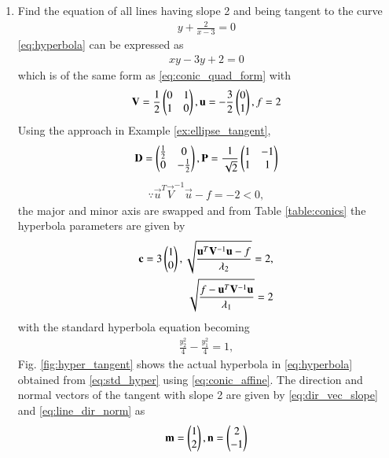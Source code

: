 \renewcommand{\theequation}{\theenumi}
\begin{enumerate}[label=\thesubsection.\arabic*.,ref=\thesubsection.\theenumi]
\item 
Find the equation of all lines having slope 2 and being tangent to the curve 
\begin{align}
\label{eq:hyperbola}
y + \frac{2}{x-3} = 0
\end{align}
\solution 
\eqref{eq:hyperbola} can be expressed as
\begin{align}
\label{eq:conic_nofrac}
xy -3y + 2 = 0
\end{align}
which is of the same form as \eqref{eq:conic_quad_form} with 
\begin{align}
\label{eq:hyper_quad_form_param}
\mathbf{V} = \frac{1}{2}\begin{pmatrix}0 & 1\\ 1 & 0\end{pmatrix}, \mathbf{u} = -\frac{3}{2}\begin{pmatrix}0 \\1\end{pmatrix}, f = 2
\end{align}
Using the approach in Example \ref{ex:ellipse_tangent},
\begin{align}
\mathbf{D} = \begin{pmatrix}\frac{1}{2} & 0 \\ 0 & -\frac{1}{2}\end{pmatrix}, \mathbf{P} = \frac{1}{\sqrt{2}}\begin{pmatrix}1 & -1\\1 & 1\end{pmatrix}
\end{align}
\begin{align}
\because \vec{u}^T\vec{V}^{-1}\vec{u}-f = -2 < 0,
\end{align} 
the major and minor axis are swapped and from Table \ref{table:conics}
the hyperbola parameters are given by 
\begin{align}
\mathbf{c}= 3\begin{pmatrix}1\\0\end{pmatrix},
\sqrt{\frac{\mathbf{u}^T\mathbf{V}^{-1}\mathbf{u}-f}{\lambda_2}} = 2,
\\
\sqrt{\frac{f-\mathbf{u}^T\mathbf{V}^{-1}\mathbf{u}}{\lambda_1}} = 2
\end{align}
with the standard hyperbola equation becoming
\begin{align}
\frac{y_2^2}{4}-\frac{y_1^2}{4} = 1,
\label{eq:std_hyper}
\end{align}
%
Fig. \ref{fig:hyper_tangent}	shows  the actual hyperbola in \eqref{eq:hyperbola}  obtained from  
\eqref{eq:std_hyper}  using \eqref{eq:conic_affine}.  
The direction and normal vectors of the tangent with slope 2 are given by \eqref{eq:dir_vec_slope} and \eqref{eq:line_dir_norm} as
\begin{align}
\vec{m} = \myvec{1\\2}, \vec{n} = \myvec{2\\-1}

\end{align}
\end{enumerate}

